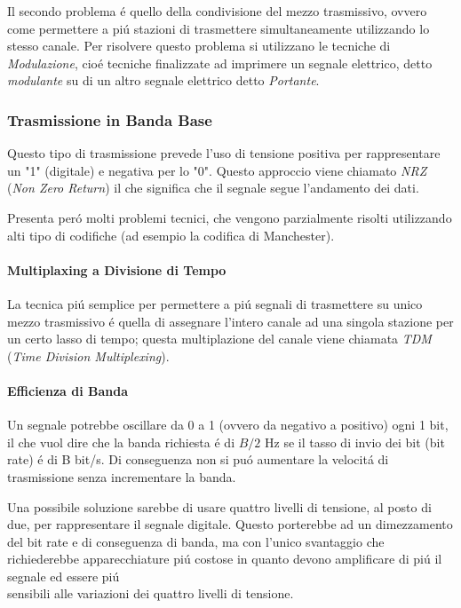 \documentclass[12pt]{article}
\begin{document}
Il secondo problema \'e quello della condivisione del mezzo trasmissivo, ovvero come permettere a pi\'u stazioni di 
trasmettere simultaneamente utilizzando lo stesso canale. Per risolvere questo problema si utilizzano le tecniche di 
\textit{Modulazione}, cio\'e tecniche finalizzate ad imprimere un segnale elettrico, detto  \textit{modulante} su di un 
altro segnale elettrico detto \textit{Portante}.

\subsubsection{Trasmissione in Banda Base}
Questo tipo di trasmissione prevede l'uso di tensione positiva per rappresentare un "1" (digitale) e negativa per lo 
"0". Questo approccio viene chiamato \textit{NRZ} (\textit{Non Zero Return}) il che significa che il segnale segue
l'andamento dei dati.

Presenta per\'o molti problemi tecnici, che vengono parzialmente risolti utilizzando alti tipo di codifiche (ad 
esempio la codifica di Manchester).

\paragraph{Multiplaxing a Divisione di Tempo} La tecnica pi\'u semplice per permettere a pi\'u segnali di trasmettere
su unico mezzo trasmissivo \'e quella di assegnare l'intero canale ad una singola stazione per un certo lasso di 
tempo; questa multiplazione del canale viene chiamata \textit{TDM} (\textit{Time Division Multiplexing}).

\paragraph{Efficienza di Banda} Un segnale potrebbe oscillare da 0 a 1 (ovvero da negativo a positivo) ogni 1 bit, il 
che vuol dire che la banda richiesta \'e di $B/2$ Hz se il tasso di invio dei bit (bit rate) \'e di B bit/s. Di
conseguenza non si pu\'o aumentare la velocit\'a di trasmissione senza incrementare la banda.

Una possibile soluzione sarebbe di usare quattro livelli di tensione, al posto di due, per rappresentare il segnale
digitale. Questo porterebbe ad un dimezzamento del bit rate e di conseguenza di banda, ma con l'unico svantaggio che 
richiederebbe apparecchiature pi\'u costose in quanto devono amplificare di pi\'u il segnale ed essere pi\'u \\
sensibili alle variazioni dei quattro livelli di tensione.
\end{document}
